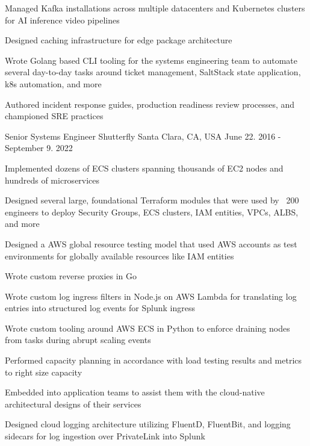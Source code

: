 \begin{cventries}
{\begin{cvitems}
        \item {Managed Kafka installations across multiple datacenters and Kubernetes clusters for AI inference video pipelines}
        \item {Designed caching infrastructure for edge package architecture}
        \item {Wrote Golang based CLI tooling for the systems engineering team to automate several day-to-day tasks around ticket management, SaltStack state application, k8s automation, and more}
        \item {Authored incident response guides, production readiness review processes, and championed SRE practices}
      \end{cvitems}
    }

  \cventry
    {Senior Systems Engineer} %
    {Shutterfly} %
    {Santa Clara, CA, USA} %
    {June 22. 2016 - September 9. 2022} %
    {
      \begin{cvitems}
        \item {Implemented dozens of ECS clusters spanning thousands of EC2 nodes and hundreds of microservices}
        \item {Designed several large, foundational Terraform modules that were used by ~200 engineers to deploy Security Groups, ECS clusters, IAM entities, VPCs, ALBS, and more}
        \item {Designed a AWS global resource testing model that used AWS accounts as test environments for globally available resources like IAM entities}
        \item {Wrote custom reverse proxies in Go}
        \item {Wrote custom log ingress filters in Node.js on AWS Lambda for translating log entries into structured log events for Splunk ingress}
        \item {Wrote custom tooling around AWS ECS in Python to enforce draining nodes from tasks during abrupt scaling events}
        \item {Performed capacity planning in accordance with load testing results and metrics to right size capacity}
        \item {Embedded into application teams to assist them with the cloud-native architectural designs of their services}
        \item {Designed cloud logging architecture utilizing FluentD, FluentBit, and logging sidecars for log ingestion over PrivateLink into Splunk}

\end{cvitems}}
\end{cventries}
